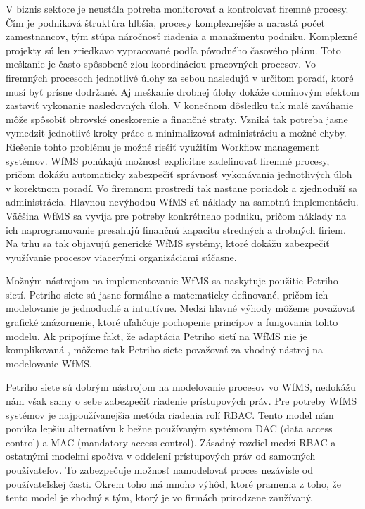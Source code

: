 
V biznis sektore je neustála potreba monitorovať a kontrolovať firemné procesy. Čím je podniková štruktúra hlbšia, procesy komplexnejšie a narastá počet zamestnancov, tým stúpa náročnosť riadenia a manažmentu podniku. Komplexné projekty sú len zriedkavo vypracované podľa pôvodného časového plánu. Toto meškanie je často spôsobené zlou koordináciou pracovných procesov. Vo firemných  procesoch jednotlivé úlohy za sebou nasledujú v určitom poradí, ktoré musí byť prísne dodržané. Aj meškanie drobnej úlohy dokáže dominovým efektom zastaviť vykonanie nasledovných úloh. V konečnom dôsledku tak malé zaváhanie môže spôsobiť obrovské oneskorenie a finančné straty.   Vzniká tak potreba jasne vymedziť jednotlivé kroky práce a minimalizovať administráciu a možné chyby. Riešenie tohto problému je možné riešiť využitím Workflow management systémov.  WfMS ponúkajú možnosť explicitne zadefinovať firemné procesy, pričom dokážu automaticky zabezpečiť správnosť vykonávania jednotlivých úloh v korektnom poradí. Vo firemnom prostredí tak nastane poriadok a zjednoduší sa administrácia. Hlavnou nevýhodou WfMS sú náklady na samotnú implementáciu. Väčšina WfMS sa vyvíja pre potreby konkrétneho podniku, pričom náklady na ich naprogramovanie presahujú finančnú kapacitu stredných a drobných firiem. Na trhu sa tak objavujú generické WfMS systémy, ktoré dokážu zabezpečiť využívanie procesov viacerými organizáciami súčasne. 

Možným nástrojom na implementovanie WfMS sa naskytuje použitie Petriho sietí. Petriho siete sú jasne formálne a matematicky definované, pričom ich modelovanie je jednoduché a intuitívne. Medzi hlavné výhody môžeme považovať grafické znázornenie, ktoré uľahčuje pochopenie princípov a fungovania tohto modelu. Ak pripojíme fakt, že adaptácia Petriho sietí na WfMS nie je komplikovaná , môžeme tak Petriho siete považovať za vhodný nástroj na modelovanie WfMS. 

Petriho siete sú dobrým nástrojom na modelovanie procesov vo WfMS, nedokážu nám však samy o sebe zabezpečiť riadenie prístupových práv. Pre potreby WfMS systémov je najpoužívanejšia metóda riadenia rolí RBAC. Tento model nám ponúka lepšiu alternatívu k bežne používaným systémom DAC (data access control) a MAC (mandatory access control). Zásadný rozdiel medzi RBAC a ostatnými modelmi spočíva v oddelení prístupových práv od samotných používateľov. To zabezpečuje možnosť namodelovať proces nezávisle od používateľskej časti. Okrem toho má mnoho výhôd, ktoré pramenia z toho, že tento model je zhodný s tým, ktorý je vo firmách prirodzene zaužívaný.



